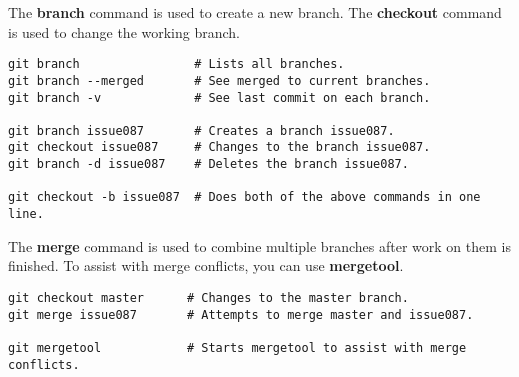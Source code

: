 The \textbf{branch} command is used to create a new branch. The \textbf{checkout} command is used to change the working branch.
\begin{lstlisting}
git branch                # Lists all branches.
git branch --merged       # See merged to current branches.
git branch -v             # See last commit on each branch.

git branch issue087       # Creates a branch issue087.
git checkout issue087     # Changes to the branch issue087.
git branch -d issue087    # Deletes the branch issue087.

git checkout -b issue087  # Does both of the above commands in one line.
\end{lstlisting}

The \textbf{merge} command is used to combine multiple branches after work on them is finished. To assist with merge conflicts, you can use \textbf{mergetool}.
\begin{lstlisting}
git checkout master      # Changes to the master branch.
git merge issue087       # Attempts to merge master and issue087.

git mergetool            # Starts mergetool to assist with merge conflicts.
\end{lstlisting}

